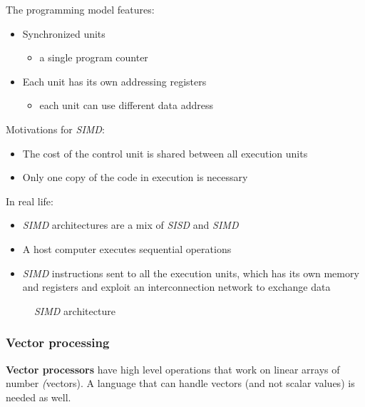 \documentclass[english]{article}
\begin{document}
The programming model features:

\begin{itemize}
  \item Synchronized units
        \begin{itemize}
          \item a single program counter
        \end{itemize}
  \item Each unit has its own addressing registers
        \begin{itemize}
          \item each unit can use different data address
        \end{itemize}
\end{itemize}

Motivations for \textit{SIMD}:

\begin{itemize}
  \item The cost of the control unit is shared between all execution units
  \item Only one copy of the code in execution is necessary
\end{itemize}

In real life:

\begin{itemize}
  \item \textit{SIMD} architectures are a mix of \textit{SISD} and \textit{SIMD}
  \item A host computer executes sequential operations
  \item \textit{SIMD} instructions sent to all the execution units, which has its own memory and registers and exploit an interconnection network to exchange data
\end{itemize}

\begin{figure}[htbp]
  \bigskip
  \centering
  \caption{\textit{SIMD} architecture}
  \label{fig:simd-architecture}
  \bigskip
\end{figure}

\subsubsection{Vector processing}

\textbf{Vector processors} have high level operations that work on linear arrays of number \textit(vectors).
A language that can handle vectors (and not scalar values) is needed as well.
\end{document}
